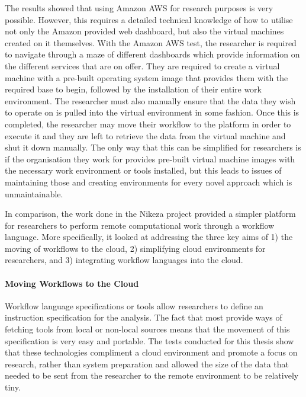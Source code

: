 The results showed that using Amazon AWS for research purposes is very possible. However, this requires a detailed technical knowledge of how to utilise not only the Amazon provided web dashboard, but also the virtual machines created on it themselves. With the Amazon AWS test, the researcher is required to navigate through a maze of different dashboards which provide information on the different services that are on offer. They are required to create a virtual machine with a pre-built operating system image that provides them with the required base to begin, followed by the installation of their entire work environment. The researcher must also manually ensure that the data they wish to operate on is pulled into the virtual environment in some fashion. Once this is completed, the researcher may move their workflow to the platform in order to execute it and they are left to retrieve the data from the virtual machine and shut it down manually. The only way that this can be simplified for researchers is if the organisation they work for provides pre-built virtual machine images with the necessary work environment or tools installed, but this leads to issues of maintaining those and creating environments for every novel approach which is unmaintainable.

In comparison, the work done in the Nikeza project provided a simpler platform for researchers to perform remote computational work through a workflow language. More specifically, it looked at addressing the three key aims of 1) the moving of workflows to the cloud, 2) simplifying cloud environments for researchers, and 3) integrating workflow languages into the cloud.

\paragraph{Moving Workflows to the Cloud}
Workflow language specifications or tools allow researchers to define an instruction specification for the analysis. The fact that most provide ways of fetching tools from local or non-local sources means that the movement of this specification is very easy and portable. The tests conducted for this thesis show that these technologies compliment a cloud environment and promote a focus on research, rather than system preparation and allowed the size of the data that needed to be sent from the researcher to the remote environment to be relatively tiny.

